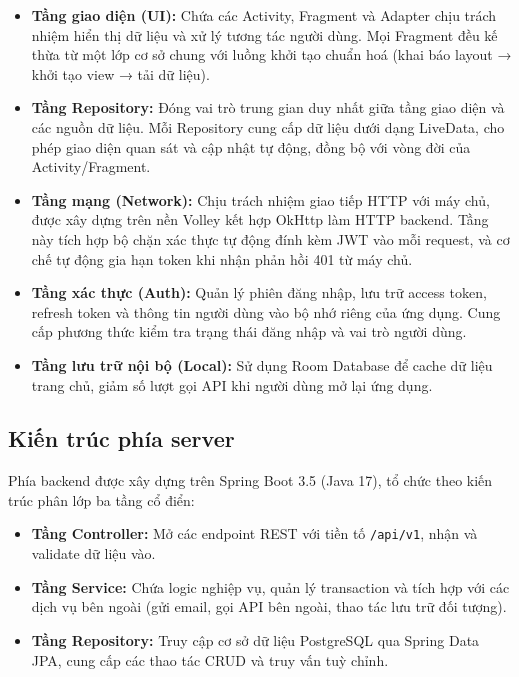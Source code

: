 \begin{itemize}
    \item \textbf{Tầng giao diện (UI):} Chứa các Activity, Fragment và Adapter chịu trách
    nhiệm hiển thị dữ liệu và xử lý tương tác người dùng. Mọi Fragment đều kế thừa từ một
    lớp cơ sở chung với luồng khởi tạo chuẩn hoá (khai báo layout → khởi tạo view → tải
    dữ liệu).

    \item \textbf{Tầng Repository:} Đóng vai trò trung gian duy nhất giữa tầng giao diện
    và các nguồn dữ liệu. Mỗi Repository cung cấp dữ liệu dưới dạng LiveData, cho phép
    giao diện quan sát và cập nhật tự động, đồng bộ với vòng đời của Activity/Fragment.

    \item \textbf{Tầng mạng (Network):} Chịu trách nhiệm giao tiếp HTTP với máy chủ,
    được xây dựng trên nền Volley kết hợp OkHttp làm HTTP backend. Tầng này tích hợp bộ
    chặn xác thực tự động đính kèm JWT vào mỗi request, và cơ chế tự động gia hạn token
    khi nhận phản hồi 401 từ máy chủ.

    \item \textbf{Tầng xác thực (Auth):} Quản lý phiên đăng nhập, lưu trữ access token,
    refresh token và thông tin người dùng vào bộ nhớ riêng của ứng dụng. Cung cấp phương
    thức kiểm tra trạng thái đăng nhập và vai trò người dùng.

    \item \textbf{Tầng lưu trữ nội bộ (Local):} Sử dụng Room Database để cache dữ liệu
    trang chủ, giảm số lượt gọi API khi người dùng mở lại ứng dụng.
\end{itemize}

\subsection{Kiến trúc phía server}
\label{subsec:kien_truc_server}

Phía backend được xây dựng trên Spring Boot 3.5 (Java 17), tổ chức theo kiến trúc phân
lớp ba tầng cổ điển:

\begin{itemize}
    \item \textbf{Tầng Controller:} Mở các endpoint REST với tiền tố \texttt{/api/v1},
    nhận và validate dữ liệu vào.

    \item \textbf{Tầng Service:} Chứa logic nghiệp vụ, quản lý transaction và tích hợp
    với các dịch vụ bên ngoài (gửi email, gọi API bên ngoài, thao tác lưu trữ đối tượng).

    \item \textbf{Tầng Repository:} Truy cập cơ sở dữ liệu PostgreSQL qua Spring Data JPA,
    cung cấp các thao tác CRUD và truy vấn tuỳ chỉnh.
\end{itemize}


